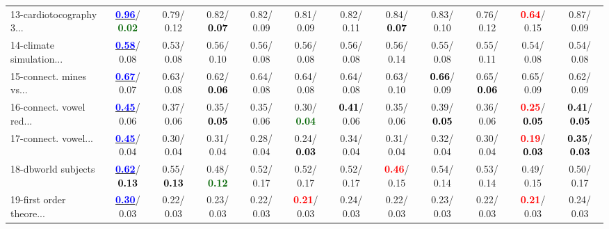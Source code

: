 \begin{table}[h]
\begin{center}
{\begin{tabular}{lc|c|c|c|c|c|c|c|c|c|c}
13-cardiotocography 3... & \underline{\textcolor{blue}{\textbf{  0.96}}}/\textcolor{darkgreen}{\textbf{  0.02}} &   0.79/  0.12 &   0.82/\textcolor{black}{\textbf{  0.07}} &   0.82/  0.09 &   0.81/  0.09 &   0.82/  0.11 &   0.84/\textcolor{black}{\textbf{  0.07}} &   0.83/  0.10 &   0.76/  0.12 & \textcolor{red}{\textbf{  0.64}}/  0.15 &   0.87/  0.09 \\
14-climate simulation... & \underline{\textcolor{blue}{\textbf{  0.58}}}/  0.08 &   0.53/  0.08 &   0.56/  0.10 &   0.56/  0.08 &   0.56/  0.08 &   0.56/  0.08 &   0.56/  0.14 &   0.55/  0.08 &   0.55/  0.11 &   0.54/  0.08 &   0.54/  0.08 \\ \hline
15-connect. mines vs... & \underline{\textcolor{blue}{\textbf{  0.67}}}/  0.07 &   0.63/  0.08 &   0.62/\textcolor{black}{\textbf{  0.06}} &   0.64/  0.08 &   0.64/  0.08 &   0.64/  0.08 &   0.63/  0.10 & \textcolor{black}{\textbf{  0.66}}/  0.09 &   0.65/\textcolor{black}{\textbf{  0.06}} &   0.65/  0.09 &   0.62/  0.09 \\
16-connect. vowel red... & \underline{\textcolor{blue}{\textbf{  0.45}}}/  0.06 &   0.37/  0.06 &   0.35/\textcolor{black}{\textbf{  0.05}} &   0.35/  0.06 &   0.30/\textcolor{darkgreen}{\textbf{  0.04}} & \textcolor{black}{\textbf{  0.41}}/  0.06 &   0.35/  0.06 &   0.39/\textcolor{black}{\textbf{  0.05}} &   0.36/  0.06 & \textcolor{red}{\textbf{  0.25}}/\textcolor{black}{\textbf{  0.05}} & \textcolor{black}{\textbf{  0.41}}/\textcolor{black}{\textbf{  0.05}} \\
17-connect. vowel... & \underline{\textcolor{blue}{\textbf{  0.45}}}/  0.04 &   0.30/  0.04 &   0.31/  0.04 &   0.28/  0.04 &   0.24/\textcolor{black}{\textbf{  0.03}} &   0.34/  0.04 &   0.31/  0.04 &   0.32/  0.04 &   0.30/  0.04 & \textcolor{red}{\textbf{  0.19}}/\textcolor{black}{\textbf{  0.03}} & \textcolor{black}{\textbf{  0.35}}/\textcolor{black}{\textbf{  0.03}} \\
18-dbworld subjects & \underline{\textcolor{blue}{\textbf{  0.62}}}/\textcolor{black}{\textbf{  0.13}} &   0.55/\textcolor{black}{\textbf{  0.13}} &   0.48/\textcolor{darkgreen}{\textbf{  0.12}} &   0.52/  0.17 &   0.52/  0.17 &   0.52/  0.17 & \textcolor{red}{\textbf{  0.46}}/  0.15 &   0.54/  0.14 &   0.53/  0.14 &   0.49/  0.15 &   0.50/  0.17 \\
19-first order theore... & \underline{\textcolor{blue}{\textbf{  0.30}}}/  0.03 &   0.22/  0.03 &   0.23/  0.03 &   0.22/  0.03 & \textcolor{red}{\textbf{  0.21}}/  0.03 &   0.24/  0.03 &   0.22/  0.03 &   0.23/  0.03 &   0.22/  0.03 & \textcolor{red}{\textbf{  0.21}}/  0.03 &   0.24/  0.03 \\

\end{tabular}}
\end{center}
\end{table}
